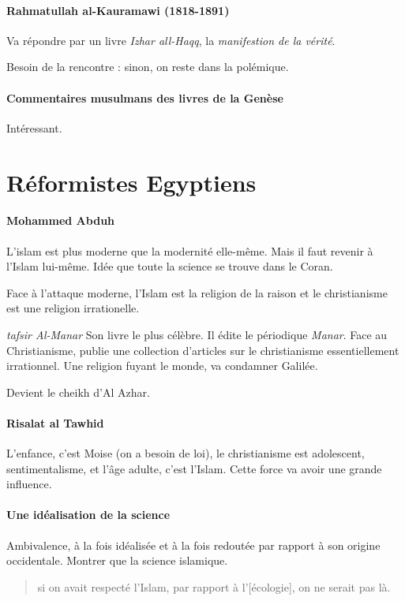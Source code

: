 \paragraph{Rahmatullah al-Kauramawi (1818-1891)}  Va répondre par un livre \textit{Izhar all-Haqq}, la \textit{manifestion de la vérité}. 

\begin{Prop}
Besoin de la rencontre : sinon, on reste dans la polémique. 
\end{Prop}


\paragraph{Commentaires musulmans des livres de la Genèse} Intéressant. 

\section{Réformistes Egyptiens}


\paragraph{Mohammed Abduh} L'islam est plus moderne que la modernité elle-même. Mais il faut revenir à l'Islam lui-même. Idée que toute la science se trouve dans le Coran.

Face à l'attaque moderne, l'Islam est la religion de la raison et le christianisme est une religion irrationelle.

\textit{tafsir Al-Manar} Son livre le plus célèbre. Il édite le périodique \textit{Manar}.
Face au Christianisme, publie une collection d'articles sur le christianisme essentiellement irrationnel. Une religion fuyant le monde, va condamner Galilée.


Devient le cheikh d'Al Azhar.

\paragraph{Risalat al Tawhid} L'enfance, c'est Moise (on a besoin de loi), le christianisme est adolescent, sentimentalisme, et l'âge adulte, c'est l'Islam. Cette force va avoir une grande influence. 

\paragraph{Une idéalisation de la science} Ambivalence, à la fois idéalisée et à la fois redoutée par rapport à son origine occidentale. Montrer que la science islamique. 
\begin{quote}
    si on avait respecté l'Islam, par rapport à l'[écologie], on ne serait pas là.
\end{quote}

